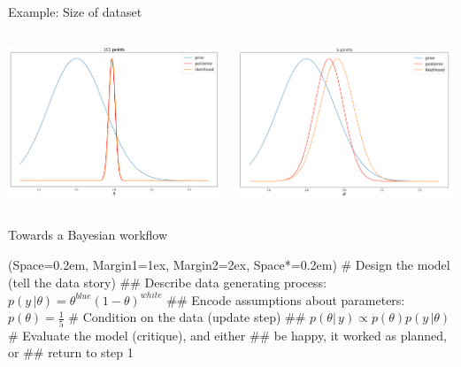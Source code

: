 \documentclass[12pt, aspectratio=149]{beamer}
\newcommand{\listSpace}{0.2em}
\theoremstyle{plain}
\begin{document}
\begin{frame}[fragile]{Example: Size of dataset}
\begin{columns}
        \begin{center}
             \includegraphics[scale=0.43]{figs/linreg_likelihood_posterior_N100_example.png} 
        \end{center}
        \begin{center}
            \includegraphics[scale=0.43]{figs/linreg_likelihood_posterior_N5_example.png}
        \end{center}
\end{columns}

\end{frame}


\begin{frame}[fragile]{Towards a Bayesian workflow}
	\begin{easylist}[enumerate]
		\ListProperties(Space=\listSpace, Margin1=1ex, Margin2=2ex, Space*=\listSpace)
		# Design the model (tell the data story)
		## Describe data generating process: $p(y \, \vert \theta) = \theta^{blue} (1 - \theta)^{white}$
		## Encode assumptions about parameters: $p(\theta) = \frac{1}{5}$
		# Condition on the data (update step)
		## $p(\theta \vert \, y) \propto p(\theta) p(y \, \vert \theta)$
		# Evaluate the model (critique), and either
		## be happy, it worked as planned, or
		## return to step 1
	\end{easylist}
\end{frame}
\end{document}

